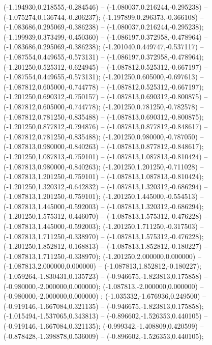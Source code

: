  (-1.194930,0.218555,-0.284546) -- (-1.080037,0.216244,-0.295238) -- (-1.075274,0.136744,-0.206237);
 (-1.197899,0.296373,-0.366108) -- (-1.083686,0.295069,-0.386238) -- (-1.080037,0.216244,-0.295238);
 (-1.199939,0.373499,-0.450360) -- (-1.086197,0.372958,-0.478964) -- (-1.083686,0.295069,-0.386238);
 (-1.201040,0.449747,-0.537117) -- (-1.087554,0.449655,-0.573131) -- (-1.086197,0.372958,-0.478964);
 (-1.201250,0.525312,-0.624945) -- (-1.087812,0.525312,-0.667197) -- (-1.087554,0.449655,-0.573131);
 (-1.201250,0.605000,-0.697613) -- (-1.087812,0.605000,-0.744778) -- (-1.087812,0.525312,-0.667197);
 (-1.201250,0.690312,-0.750157) -- (-1.087813,0.690312,-0.800875) -- (-1.087812,0.605000,-0.744778);
 (-1.201250,0.781250,-0.782578) -- (-1.087812,0.781250,-0.835488) -- (-1.087813,0.690312,-0.800875);
 (-1.201250,0.877812,-0.794876) -- (-1.087813,0.877812,-0.848617) -- (-1.087812,0.781250,-0.835488);
 (-1.201250,0.980000,-0.787050) -- (-1.087813,0.980000,-0.840263) -- (-1.087813,0.877812,-0.848617);
 (-1.201250,1.087813,-0.759101) -- (-1.087813,1.087813,-0.810424) -- (-1.087813,0.980000,-0.840263);
 (-1.201250,1.201250,-0.711028) -- (-1.087813,1.201250,-0.759101) -- (-1.087813,1.087813,-0.810424);
 (-1.201250,1.320312,-0.642832) -- (-1.087813,1.320312,-0.686294) -- (-1.087813,1.201250,-0.759101);
 (-1.201250,1.445000,-0.554513) -- (-1.087813,1.445000,-0.592003) -- (-1.087813,1.320312,-0.686294);
 (-1.201250,1.575312,-0.446070) -- (-1.087813,1.575312,-0.476228) -- (-1.087813,1.445000,-0.592003);
 (-1.201250,1.711250,-0.317503) -- (-1.087813,1.711250,-0.338970) -- (-1.087813,1.575312,-0.476228);
 (-1.201250,1.852812,-0.168813) -- (-1.087813,1.852812,-0.180227) -- (-1.087813,1.711250,-0.338970);
 (-1.201250,2.000000,0.000000) -- (-1.087813,2.000000,0.000000) -- (-1.087813,1.852812,-0.180227);
 (-1.059264,-1.830431,0.135723) -- (-0.946675,-1.823813,0.175858) -- (-0.980000,-2.000000,0.000000);
 (-1.087813,-2.000000,0.000000) -- (-0.980000,-2.000000,0.000000) ;
 (-1.035332,-1.676936,0.249500) -- (-0.919146,-1.667084,0.321135) -- (-0.946675,-1.823813,0.175858);
 (-1.015494,-1.537065,0.343813) -- (-0.896602,-1.526353,0.440105) -- (-0.919146,-1.667084,0.321135);
 (-0.999342,-1.408809,0.420599) -- (-0.878428,-1.398878,0.536009) -- (-0.896602,-1.526353,0.440105);

